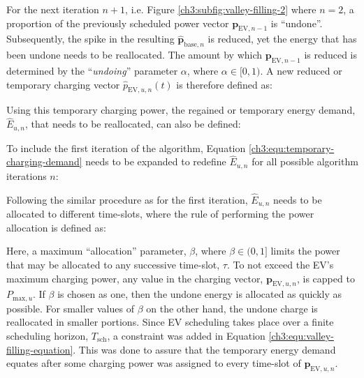 For the next iteration $n+1$, i.e. Figure \ref{ch3:subfig:valley-filling-2} where $n=2$, a proportion of the previously scheduled power vector $\textbf{p}_{\text{EV},n-1}$ is ``undone''.
Subsequently, the spike in the resulting $\hat{\textbf{p}}_{\text{base}, n}$ is reduced, yet the energy that has been undone needs to be reallocated.
The amount by which $\textbf{p}_{\text{EV},n-1}$ is reduced is determined by the ``\textit{undoing}'' parameter $\alpha$, where $\alpha \in [0, 1)$.
A new reduced or temporary charging vector $\hat{p}_{\text{EV}, u, n}(t)$ is therefore defined as:



Using this temporary charging power, the regained or temporary energy demand, $\hat{E}_{u,n}$, that needs to be reallocated, can also be defined:



To include the first iteration of the algorithm, Equation \ref{ch3:equ:temporary-charging-demand} needs to be expanded to redefine $\hat{E}_{u,n}$ for all possible algorithm iterations $n$:



Following the similar procedure as for the first iteration, $\hat{E}_{u,n}$ needs to be allocated to different time-slots, where the rule of performing the power allocation is defined as:



\nomenclature[K]{$\beta$}{Allocation parameter to assign a portion of the temporary energy demand, $\hat{E}_{u,n}$, where $\beta \in (0, 1]$ (Chapter \ref{ch3})}

Here, a maximum ``allocation'' parameter, $\beta$, where $\beta \in (0, 1]$ limits the power that may be allocated to any successive time-slot, $\tau$.
To not exceed the EV's maximum charging power, any value in the charging vector, $\textbf{p}_{\text{EV},u,n}$, is capped to $P_{\text{max},u}$.
If $\beta$ is chosen as one, then the undone energy is allocated as quickly as possible.
For smaller values of $\beta$ on the other hand, the undone charge is reallocated in smaller portions.
Since EV scheduling takes place over a finite scheduling horizon, $T_\text{sch}$, a constraint was added in Equation \ref{ch3:equ:valley-filling-equation}.
This was done to assure that the temporary energy demand equates after some charging power was assigned to every time-slot of $\textbf{p}_{\text{EV},u,n}$.

